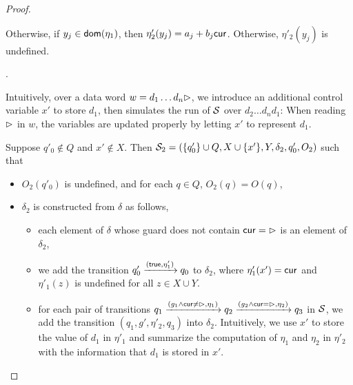 \begin{appendix}
\begin{proof}
\begin{itemize}
\begin{itemize}
\begin{itemize}
{%
Otherwise, if $y_j \in \mathsf{dom}(\eta_1)$, then $\eta'_2(y_j)= a_{j} + b_{j} \mathsf{cur}$. Otherwise, $\eta'_2(y_j)$ is undefined.}
\end{itemize}
\end{itemize}
\end{itemize}

\smallskip

.

Intuitively, over a data word $w=d_1\dots d_n\rhd$, we introduce an additional control variable $x'$ to store $d_1$, then simulates the run of ${\mathcal{S} }$ over $d_2\dots d_n d_1$: When reading $\rhd$ in $w$, the variables are updated properly by letting $x'$ to represent $d_1$.



Suppose $q'_{0} \not \in Q$ and $x' \not \in X$. Then ${\mathcal{S} }_2 = (\{q'_0\} \cup Q, X\cup\{x'\}, Y, \delta_2, q'_{0}, O_2)$ such that  
\begin{itemize}
\item $O_2(q'_0)$ is undefined, and for each $q \in Q$, $O_2(q)=O(q)$,	
	
\item $\delta_2$ is constructed from $\delta$ as follows,
	\begin{itemize}
	\item each element of $\delta$ whose guard does not contain $\mathsf{cur} = \rhd$ is an element of $\delta_2$,

	\item we add the transition $q'_0 \xrightarrow{(\mathsf{true},\eta'_1)} q_0$ to $\delta_2$, where $\eta'_1(x') =\mathsf{cur}$ and $\eta'_1(z)$ is undefined for all $z \in X\cup Y$.

	\item for each pair of transitions $q_1 \xrightarrow{(g_1 \wedge \mathsf{cur} \neq \rhd, \eta_1)} q_2 \xrightarrow{(g_2\wedge \mathsf{cur}=\rhd, \eta_2)} q_3$ in ${\mathcal{S} }$, we add the transition $(q_1, g', \eta'_2, q_3)$ into $\delta_2$. Intuitively, we use $x'$ to store the value of $d_1$ in $ \eta'_1$ and summarize the computation of $\eta_1$ and $\eta_2$ in $\eta'_2$ with the information that $d_1$ is stored in $x'$.



\end{itemize}
\end{itemize}
\end{proof}
\end{appendix}
